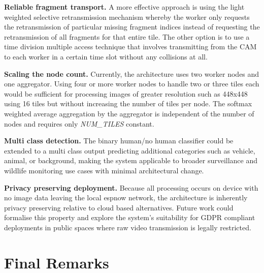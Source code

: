 \textbf{Reliable fragment transport.} A more effective approach is using the light weighted selective retransmission mechanism whereby the worker only requests the retransmission of particular missing fragment indices instead of requesting the retransmission of all fragments for that entire tile. The other option is to use a time division multiple access technique that involves transmitting from the CAM to each worker in a certain time slot without any collisions at all.
 
\textbf{Scaling the node count.} Currently, the architecture uses two worker nodes and one aggregator. Using four or more worker nodes to handle two or three tiles each would be sufficient for processing images of greater resolution such as 448x448 using 16 tiles but without increasing the number of tiles per node. The softmax weighted average aggregation by the aggregator is independent of the number of nodes and requires only \textit{NUM\_TILES} constant.
 
\textbf{Multi class detection.} The binary human/no human classifier could be extended
to a multi class output predicting additional categories such as vehicle, animal, or
background, making the system applicable to broader surveillance and wildlife monitoring
use cases with minimal architectural change.
 
\textbf{Privacy preserving deployment.} Because all processing occurs on device with no
image data leaving the local \gls{espnow} network, the architecture is inherently
privacy preserving relative to cloud based alternatives. Future work could formalise
this property and explore the system's suitability for GDPR compliant deployments in
public spaces where raw video transmission is legally restricted.
 
\section{Final Remarks}
 
